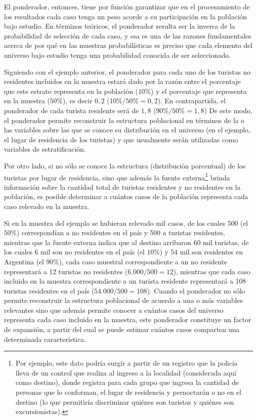 \documentclass[
]{book}
\begin{document}
El ponderador, entonces, tiene por función garantizar que en el procesamiento de los resultados cada caso tenga un peso acorde a su participación en la población bajo estudio. En términos teóricos, el ponderador resulta ser la inversa de la probabilidad de selección de cada caso, y esa es una de las razones fundamentales acerca de por qué en las muestras probabilísticas es preciso que cada elemento del universo bajo estudio tenga una probabilidad conocida de ser seleccionado.

Siguiendo con el ejemplo anterior, el ponderador para cada uno de los turistas no residentes incluidos en la muestra estará dado por la razón entre el porcentaje que este estrato representa en la población (\(10\%\)) y el porcentaje que representa en la muestra (\(50\%\)), es decir \(0,2\) (\(10\%/50\%=0,2\)). En contrapartida, el ponderador de cada turista residente será de \(1,8\) (\(90\%/50\%=1,8\)) De este modo, el ponderador permite reconstruir la estructura poblacional en términos de la o las variables sobre las que se conoce su distribución en el universo (en el ejemplo, el lugar de residencia de los turistas) y que usualmente serán utilizadas como variables de estratificación.

Por otro lado, si no sólo se conoce la estructura (distribución porcentual) de los turistas por lugar de residencia, sino que además la fuente externa\footnote{Por ejemplo, este dato podría surgir a partir de un registro que la policía lleva de un control que realiza al ingreso a la localidad (considerada aquí como destino), donde registra para cada grupo que ingresa la cantidad de personas que lo conforman, el lugar de residencia y pernoctarán o no en el destino (lo que permitiría discriminar quiénes son turistas y quiénes son excursionistas).} brinda información sobre la cantidad total de turistas residentes y no residentes en la población, es posible determinar a cuántos casos de la población representa cada caso relevado en la muestra.

Si en la muestra del ejemplo se hubieran relevado mil casos, de los cuales 500 (el \(50\%\)) correspondían a no residentes en el país y 500 a turistas residentes, mientras que la fuente externa indica que al destino arribaron 60 mil turistas, de los cuales 6 mil son no residentes en el país (el \(10\%\)) y 54 mil son residentes en Argentina (el \(90\%\)), cada caso muestral correspondiente a un no residente representará a 12 turistas no residentes (\(6.000/500=12\)), mientras que cada caso incluido en la muestra correspondiente a un turista residente representará a 108 turistas residentes en el país (\(54.000/500=108\)). Cuando el ponderador no sólo permite reconstruir la estructura poblacional de acuerdo a una o más variables relevantes sino que además permite conocer a cuántos casos del universo representa cada caso incluido en la muestra, este ponderador constituye un factor de expansión, a partir del cual se puede estimar cuántos casos comparten una determinada característica.
\end{document}
